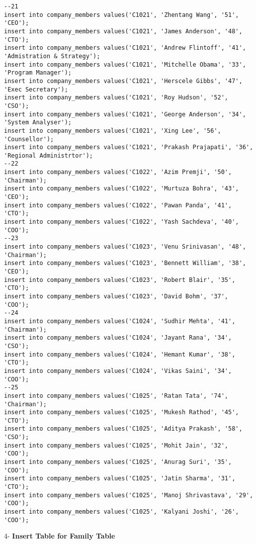 \documentclass[a4,12pt]{report}
\begin{document}
\begin{lstlisting}
--21
insert into company_members values('C1021', 'Zhentang Wang', '51', 'CEO');
insert into company_members values('C1021', 'James Anderson', '48', 'CTO');
insert into company_members values('C1021', 'Andrew Flintoff', '41', 'Admistration & Strategy');
insert into company_members values('C1021', 'Mitchelle Obama', '33', 'Program Manager');
insert into company_members values('C1021', 'Herscele Gibbs', '47', 'Exec Secretary');
insert into company_members values('C1021', 'Roy Hudson', '52', 'CSO');
insert into company_members values('C1021', 'George Anderson', '34', 'System Analyser');
insert into company_members values('C1021', 'Xing Lee', '56', 'Counsellor');
insert into company_members values('C1021', 'Prakash Prajapati', '36', 'Regional Administrtor');
--22
insert into company_members values('C1022', 'Azim Premji', '50', 'Chairman');
insert into company_members values('C1022', 'Murtuza Bohra', '43', 'CEO');
insert into company_members values('C1022', 'Pawan Panda', '41', 'CTO');
insert into company_members values('C1022', 'Yash Sachdeva', '40', 'COO');
--23
insert into company_members values('C1023', 'Venu Srinivasan', '48', 'Chairman');
insert into company_members values('C1023', 'Bennett William', '38', 'CEO');
insert into company_members values('C1023', 'Robert Blair', '35', 'CTO');
insert into company_members values('C1023', 'David Bohm', '37', 'COO');
--24
insert into company_members values('C1024', 'Sudhir Mehta', '41', 'Chairman');
insert into company_members values('C1024', 'Jayant Rana', '34', 'CSO');
insert into company_members values('C1024', 'Hemant Kumar', '38', 'CTO');
insert into company_members values('C1024', 'Vikas Saini', '34', 'COO');
--25
insert into company_members values('C1025', 'Ratan Tata', '74', 'Chairman');
insert into company_members values('C1025', 'Mukesh Rathod', '45', 'CTO');
insert into company_members values('C1025', 'Aditya Prakash', '58', 'CSO');
insert into company_members values('C1025', 'Mohit Jain', '32', 'COO');
insert into company_members values('C1025', 'Anurag Suri', '35', 'COO');
insert into company_members values('C1025', 'Jatin Sharma', '31', 'CTO');
insert into company_members values('C1025', 'Manoj Shrivastava', '29', 'COO');
insert into company_members values('C1025', 'Kalyani Joshi', '26', 'COO');

\end{lstlisting}

\begin{flushleft}
4- \textbf{ Insert Table for Family Table}
\end{flushleft}
\end{document}
